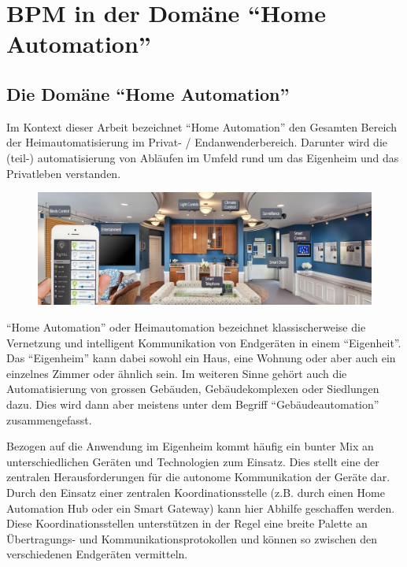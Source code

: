 
\chapter{BPM in der Domäne "`Home Automation"'}

\section{Die Domäne "`Home Automation"'}
Im Kontext dieser Arbeit bezeichnet "`Home Automation"' den Gesamten Bereich der Heimautomatisierung im Privat- / Endanwenderbereich. Darunter wird die (teil-) automatisierung von Abläufen im Umfeld rund um das Eigenheim und das Privatleben verstanden.

\begin{figure}[H]
  \centering
  \includegraphics[width=15cm]{./images/home_automation_system}

\end{figure}
"`Home Automation"' oder Heimautomation bezeichnet klassischerweise die Vernetzung und intelligent Kommunikation von Endgeräten in einem "`Eigenheit"'. Das "`Eigenheim"' kann dabei sowohl ein Haus, eine Wohnung oder aber auch ein einzelnes Zimmer oder ähnlich sein. Im weiteren Sinne gehört auch die Automatisierung von grossen Gebäuden, Gebäudekomplexen oder Siedlungen dazu. Dies wird dann aber meistens unter dem Begriff "`Gebäudeautomation"' zusammengefasst.

Bezogen auf die Anwendung im Eigenheim kommt häufig ein bunter Mix an unterschiedlichen Geräten und Technologien zum Einsatz. Dies stellt eine der zentralen Herausforderungen für die autonome Kommunikation der Geräte dar. Durch den Einsatz einer zentralen Koordinationsstelle (z.B. durch einen Home Automation Hub oder ein Smart Gateway) kann hier Abhilfe geschaffen werden. Diese Koordinationsstellen unterstützen in der Regel eine breite Palette an Übertragungs- und Kommunikationsprotokollen und können so zwischen den verschiedenen Endgeräten vermitteln. 

